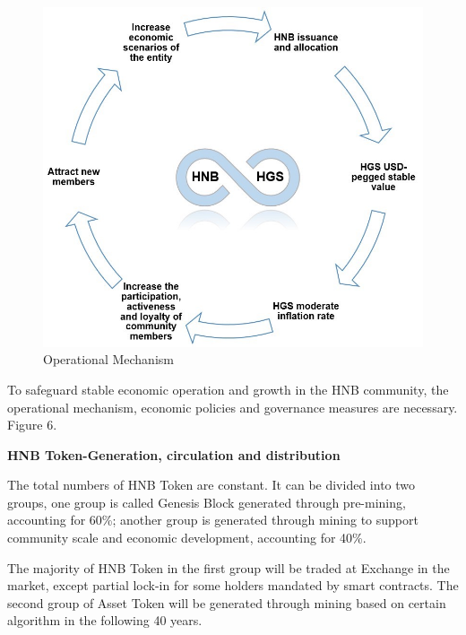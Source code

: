 \documentclass[fleqn,10pt]{SelfArx} %
\begin{document}
\begin{figure}[ht]\centering
\includegraphics[width=\linewidth]{6}
\caption{Operational Mechanism}
\label{fig:6}
\end{figure}



To safeguard stable economic operation and growth in the HNB community, the operational mechanism, economic policies and governance measures are necessary. Figure 6.\\




\textbf {HNB Token-Generation, circulation and distribution}

The total numbers of HNB Token are constant. It can be divided into two groups, one group is called Genesis Block generated through pre-mining, accounting for 60\%; another group is generated through mining to support community scale and economic development, accounting for 40\%.

The majority of HNB Token in the first group will be traded at Exchange in the market, except partial lock-in for some holders mandated by smart contracts. The second group of Asset Token will be generated through mining based on certain algorithm in the following 40 years. 
\end{document}
